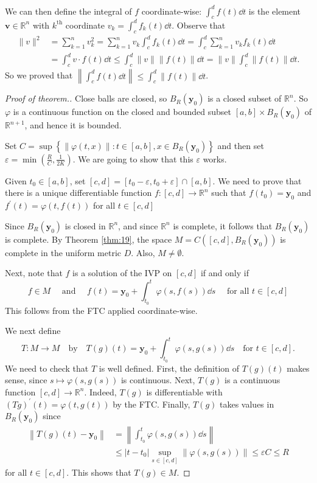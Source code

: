 \documentclass[a4paper,11pt]{article}
\begin{document}
We can then define the integral of $f$ coordinate-wise: $\int_c^d f(t) \dd t$ is the element $\mathbf{v} \in \mathbb{R}^n$ with $k^{\text {th}}$ coordinate $v_k=\int_c^d f_k(t) \dd t$. Observe that
\[
\begin{aligned}
\|v\|^2 &=\sum_{k=1}^n v_k^2=\sum_{k=1}^n v_k \int_c^d f_k(t) \dd t=\int_c^d \sum_{k=1}^n v_k f_k(t) \dd t \\
&=\int_c^d v \cdot f(t) \dd t \leqslant \int_c^d\|v\|\|f(t)\| \dd t=\|v\| \int_c^d\|f(t)\| \dd t.
\end{aligned}
\]
So we proved that $\left\|\int_c^d f(t) \dd t\right\| \leqslant \int_c^d\|f(t)\| \dd t$.

\begin{proof}[Proof of theorem.]
    Close balls are closed, so $B_R\left(\mathbf y_0\right)$ is a closed subset of $\mathbb{R}^n$. So $\varphi$ is a continuous function on the closed and bounded subset $[a, b] \times B_R\left(\mathbf y_0\right)$ of $\mathbb{R}^{n+1}$, and hence it is bounded. 
    
    Set $C=\sup \left\{\|\varphi(t, x)\|: t \in[a, b], x \in B_R\left(\mathbf y_0\right)\right\}$ and then set $\varepsilon=\min \left(\frac{R}{C}, \frac{1}{2 K}\right)$. We are going to show that this $\varepsilon$ works.

    Given $t_0 \in[a, b]$, set $[c, d]=\left[t_0-\varepsilon, t_0+\varepsilon\right] \cap[a, b]$. We need to prove that there is a unique differentiable function $f:[c, d] \rightarrow \mathbb{R}^n$ such that $f\left(t_0\right)=\mathbf y_0$ and $f^{\prime}(t)=\varphi(t, f(t))$ for all $t \in[c, d]$

    Since $B_R\left(\mathbf{y}_0\right)$ is closed in $\mathbb{R}^n$, and since $\mathbb{R}^n$ is complete, it follows that $B_R\left(\mathbf y_0\right)$ is complete. By Theorem \ref{thm:19}, the space $M=C\left([c, d], B_R\left(\mathbf y_0\right)\right)$ is complete in the uniform metric $D$. Also, $M \neq \emptyset$.

    Next, note that $f$ is a solution of the IVP on $[c, d]$ if and only if
    \[
    f \in M \quad \text { and } \quad f(t)=\mathbf y_0+\int_{t_0}^t \varphi(s, f(s)) \dd s \quad \text { for all } t \in[c, d]
    \]
    This follows from the FTC applied coordinate-wise.

    We next define
    \[
        T: M \rightarrow M \quad \text{by} \quad T(g)(t)=\mathbf y_0+\int_{t_0}^t \varphi(s, g(s)) \dd s \quad \text{for } t \in[c, d].
    \]
    We need to check that $T$ is well defined. First, the definition of $T(g)(t)$ makes sense, since
    $s \mapsto \varphi(s, g(s))$ is continuous. Next, $T(g)$ is a continuous function $[c, d] \rightarrow \mathbb{R}^n$.
    Indeed, $T(g)$ is differentiable with $(T g)^{\prime}(t)=\varphi(t, g(t))$ by the FTC. Finally, $T(g)$ takes values in $B_R\left(\mathbf y_0\right)$ since
    \begin{align*}
        \left\|T(g)(t)-\mathbf y_0\right\|&=\left\|\int_{t_0}^t \varphi(s, g(s)) \dd s\right\| \\ 
        &\leqslant\left|t-t_0\right| \sup _{s \in[c, d]}\|\varphi(s, g(s))\| \leqslant \varepsilon C \leqslant R \tag{$*$}
    \end{align*}
    for all $t \in[c, d]$. This shows that $T(g) \in M$.


\end{proof}
\end{document}
